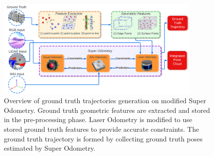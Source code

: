 \documentclass[10pt,twocolumn,letterpaper]{article}
\begin{document}



\begin{figure}[ht!]
    \centering
    \includegraphics[width=0.9\textwidth,height=\textheight,keepaspectratio]{figure/localization_demo_10.png}
    \caption{Overview of ground truth trajectories generation on modified Super Odometry. Ground truth geometric features are extracted and stored in the pre-processing phase. Laser Odometry is modified to use stored ground truth features to provide accurate constraints. The ground truth trajectory is formed by collecting ground truth poses estimated by Super Odometry.}
    \label{fig:localization}
\end{figure}
\end{document}
